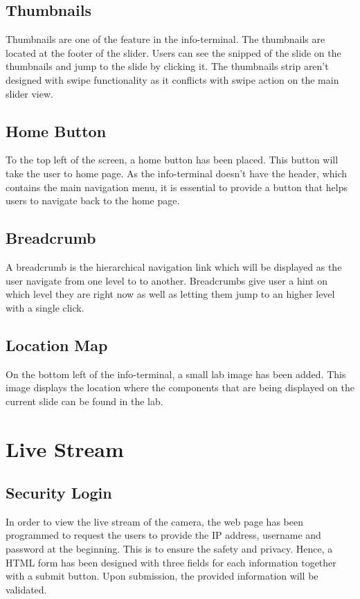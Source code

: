 \subsection*{Thumbnails}
Thumbnails are one of the feature in the info-terminal. The thumbnails are located at the footer of the slider. Users can see the snipped of the slide on the thumbnails and jump to the slide by clicking it. The thumbnails strip aren't designed with swipe functionality as it conflicts with swipe action on the main slider view.

\subsection*{Home Button}
To the top left of the screen, a home button has been placed. This button will take the user to home page. As the info-terminal doesn't have the header, which contains the main navigation menu, it is essential to provide a button that helps users to navigate back to the home page.

\subsection*{Breadcrumb}
A breadcrumb is the hierarchical navigation link which will be displayed as the user navigate from one level to to another. Breadcrumbs give user a hint on which level they are right now as well as letting them jump to an higher level with a single click.

\subsection*{Location Map}
On the bottom left of the info-terminal, a small lab image has been added. This image displays the location where the components that are being displayed on the current slide can be found in the lab.

\section{Live Stream}
\subsection*{Security Login}
In order to view the live stream of the camera, the web page has been programmed to request the users to provide the IP address, username and password at the beginning. This is to ensure the safety and privacy. Hence, a HTML form has been designed with three fields for each information together with a submit button. Upon submission, the provided information will be validated.

